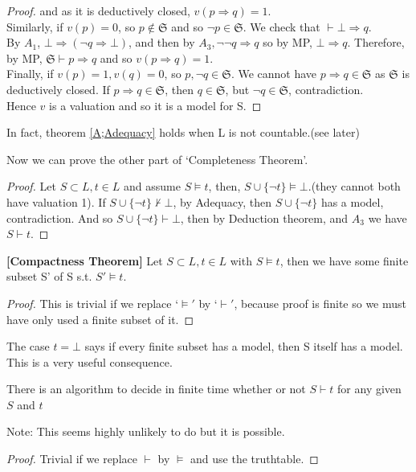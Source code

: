 \begin{proof}
and as it is deductively closed, $v(p \Rightarrow q)=1$.\\
Similarly, if $v(p)=0$, so $p \not \in \mathfrak{S}$ and so $\neg p \in
\mathfrak{S}$. We check that $\vdash \bot \Rightarrow q$.\\
By $A_1$, $\bot \Rightarrow (\neg q \Rightarrow \bot)$, and then by $A_3,
\neg \neg q \Rightarrow q$ so by MP, $\bot \Rightarrow q$. Therefore,
by MP, $\mathfrak{S} \vdash p \Rightarrow q$ and so $v(p \Rightarrow q)=1$.\\
Finally, if $v(p)=1, v(q)=0$, so $p, \neg q \in \mathfrak{S}$. We cannot have
$p \Rightarrow q \in \mathfrak{S}$ as $\mathfrak{S}$ is deductively closed.
If $p \Rightarrow q \in \mathfrak{S}$, then $q \in \mathfrak{S}$,
but $\neg q \in \mathfrak{S}$, contradiction.\\
Hence $v$ is a valuation and so it is a model for S.
\end{proof}
\begin{remark} In fact, theorem \ref{A;Adequacy} holds when L is
not countable.(see later)
\end{remark}
Now we can prove the other part of `Completeness Theorem'.
\begin{proof}
Let $S \subset L, t \in L$ and assume $S \models t$, then, $S \cup
\{\neg t\} \models \bot$.(they cannot both have valuation 1). If $S
\cup \{\neg t\} \not \vdash \bot$, by Adequacy, then $S \cup \{\neg t\}$
has a model, contradiction. And so $S \cup \{\neg t\} \vdash \bot$,
then by Deduction theorem, and $A_3$ we have $S \vdash t$.
\end{proof}
\begin{corollary}{\bf [Compactness Theorem]} Let $S \subset L, t \in L$ with $S \models t$,
then we have some finite subset S' of S s.t.
$S' \models t$.
\end{corollary}
\begin{proof} This is trivial if we replace `$\models'$ by `$\vdash'$,
because proof is finite so we must have only used a finite subset of it.
\end{proof}
\begin{remark}
The case $t = \bot$ says if every finite subset has a model,
then S itself has a model. This is a very useful consequence.
\end{remark}
\begin{corollary}
There is an algorithm to decide in finite time whether or not $S \vdash t$
for any given $S$ and $t$
\end{corollary}
Note: This seems highly unlikely to do but it is possible.\\
\begin{proof}
Trivial if we replace $\vdash$ by $\models$ and use the truthtable.
\end{proof}
